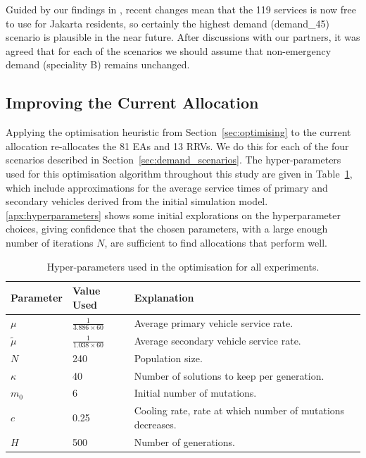 \documentclass[preprint,12pt]{elsarticle}
\begin{document}
Guided by our findings in \cite{BriceSyaribahNoor2022Esui}, recent changes
mean that the 119 services is now free to use for Jakarta residents, so
certainly the highest demand (demand\_45) scenario is plausible in the near
future. After discussions with our partners, it was agreed that for each of
the scenarios we should assume that non-emergency demand (speciality B)
remains unchanged.


\subsection{Improving the Current Allocation}\label{sec:optimise_current}
Applying the optimisation heuristic from Section~\ref{sec:optimising} to the
current allocation re-allocates the 81 EAs and 13 RRVs. We do this for each of
the four scenarios described in Section~\ref{sec:demand_scenarios}. The
hyper-parameters used for this optimisation algorithm throughout this study are
given in Table~\ref{tbl:hyperparameters}, which include approximations for the
average service times of primary and secondary vehicles derived from the initial
simulation model. \ref{apx:hyperparameters} shows some initial explorations on
the hyperparameter choices, giving confidence that the chosen parameters, with
a large enough number of iterations $N$, are sufficient to find allocations
that perform well.

\begin{table}
\begin{tabular}{lll}
\toprule
Parameter & Value Used & Explanation \\
\midrule
$\mu$ & $\frac{1}{3.886 \times 60}$ & Average primary vehicle service rate.\\
$\tilde{\mu}$ & $\frac{1}{1.038 \times 60}$ & Average secondary vehicle service rate.\\
$N$ & 240 & Population size.\\
$\kappa$ & 40 & Number of solutions to keep per generation.\\
$m_0$ & 6 & Initial number of mutations.\\
$c$ & 0.25 & Cooling rate, rate at which number of mutations decreases.\\
$H$ & 500 & Number of generations.\\
\bottomrule
\end{tabular}
\caption{Hyper-parameters used in the optimisation for all experiments.}
\label{tbl:hyperparameters}
\end{table}
\end{document}
